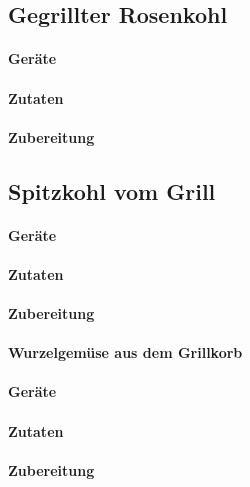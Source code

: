 \subsection{Gegrillter Rosenkohl}

\paragraph{Geräte}

\paragraph{Zutaten}

\paragraph{Zubereitung}

\subsection{Spitzkohl vom Grill}

\paragraph{Geräte}

\paragraph{Zutaten}

\paragraph{Zubereitung}

\paragraph{Wurzelgemüse aus dem Grillkorb}

\paragraph{Geräte}

\paragraph{Zutaten}

\paragraph{Zubereitung}

